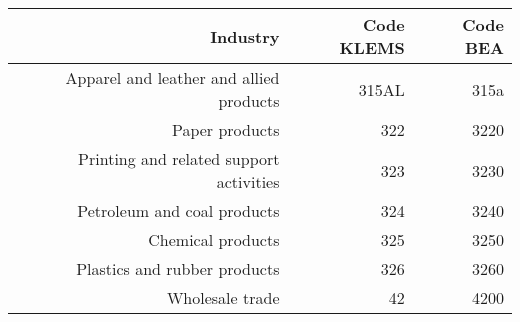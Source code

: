 \begin{table}[H]
    \begin{center}
        \begin{tabular}{rrr}
            Industry                                                             & Code KLEMS & Code BEA   \\%
            \hline\hline
            Apparel and leather and allied products                              & 315AL       & 315a      \\%
            Paper products                                                       & 322         & 3220      \\%
            Printing and related support activities                              & 323         & 3230      \\%
Petroleum and coal products                                          & 324         & 3240      \\%
Chemical products                                                    & 325         & 3250      \\%
Plastics and rubber products                                         & 326         & 3260      \\%
Wholesale trade                                                      & 42          & 4200      \\%

\end{tabular}
\end{center}
\end{table}
